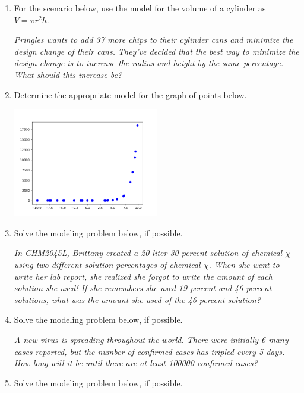 \documentclass[14pt]{extbook}
\begin{document}
\begin{enumerate}
{\begin{center}
\end{center}
} \newpage
\item{
For the scenario below, use the model for the volume of a cylinder as $V = \pi r^2 h$.
\begin{center}
    \textit{ Pringles wants to add 37  more chips to their cylinder cans and minimize the design change of their cans. They've decided that the best way to minimize the design change is to increase the radius and height by the same percentage. What should this increase be? }
\end{center}
} \newpage
\item{
Determine the appropriate model for the graph of points below.
\begin{center}
    \includegraphics[width=0.5\textwidth]{../Figures/identifyModelGraph12B.png}
\end{center}
} \newpage
\item{
Solve the modeling problem below, if possible.
\begin{center}
    \textit{ In CHM2045L, Brittany created a 20 liter 30 percent solution of chemical $\chi$ using two different solution percentages of chemical $\chi$. When she went to write her lab report, she realized she forgot to write the amount of each solution she used! If she remembers she used 19 percent and 46 percent solutions, what was the amount she used of the 46 percent solution? }
\end{center}
} \newpage
\item{
Solve the modeling problem below, if possible.
\begin{center}
    \textit{ A new virus is spreading throughout the world. There were initially 6 many cases reported, but the number of confirmed cases has tripled every 5 days. How long will it be until there are at least 100000 confirmed cases? }
\end{center}
} \newpage
\item{
Solve the modeling problem below, if possible.
\begin{center}

\end{center}}
\end{enumerate}
\end{document}
